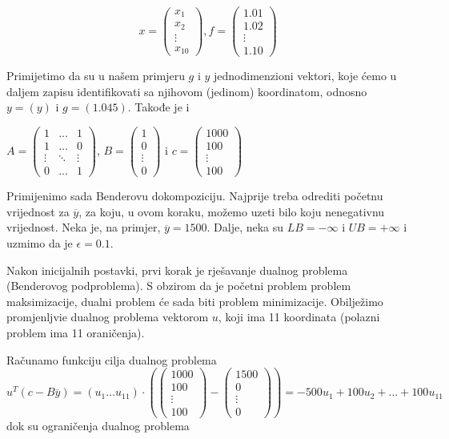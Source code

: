 \documentclass[a4paper, utf8, 11pt, colorlinks]{book}
\theoremstyle{definition}
\begin{document}
$$x=\left(\begin{array}{c}
	x_1 \\
	x_2 \\
	\vdots \\
	x_{10}
\end{array}\right) ,  
 f = \left(\begin{array}{c}
	1.01 \\
	1.02 \\
	\vdots \\
	1.10
\end{array}\right)$$

Primijetimo da su u našem primjeru $g$ i $y$ jednodimenzioni vektori, koje ćemo u daljem zapisu identifikovati sa njihovom (jedinom) koordinatom, odnosno
$y=(y)$ i $g=(1.045)$. Takođe je i 

$A=\left(
\begin{array}{ccc}
	1 & \ldots & 1 \\
	1 & \ldots & 0 \\
	\vdots & \ddots & \vdots \\
	0 & \ldots & 1
\end{array}\right)$, \quad
$B=\left(\begin{array}{c}
	1 \\
	0 \\
	\vdots \\
	0
\end{array}\right)$ i \quad 
$c=\left(\begin{array}{c}
	1000 \\
	100 \\
	\vdots \\
	100
\end{array}\right)$ 


Primijenimo sada Benderovu dokompoziciju. Najprije treba odrediti početnu vrijednost za $\overline{y}$, za koju, u ovom koraku, možemo uzeti bilo koju nenegativnu vrijednost. Neka je, na primjer, $\overline{y}=1500$. Dalje, neka su $LB=-\infty$ i $UB=+\infty$ i uzmimo da je $\epsilon = 0.1$.

 Nakon inicijalnih postavki, prvi korak je rješavanje dualnog problema (Benderovog podproblema). S obzirom da je početni problem problem maksimizacije, dualni problem će sada biti problem minimizacije. Obilježimo promjenljvie dualnog problema vektorom  $u$, koji ima 11 koordinata (polazni problem ima 11 oraničenja).
 
 Računamo funkciju cilja dualnog problema
 $$
u^T (c-B\overline{y})=(u_1\ldots u_{11})\cdot \left(\left(\begin{array}{c}
	1000 \\
	100 \\
	\vdots \\
	100
\end{array}\right)-\left(\begin{array}{c}
1500 \\
0 \\
\vdots \\
0
\end{array}\right)\right) = -500u_1+100u_2+\ldots+100u_{11}
$$
dok su ograničenja dualnog problema
\end{document}
